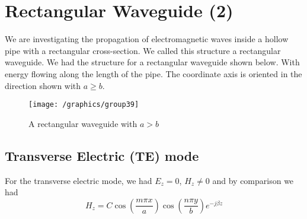 \chapter{Rectangular Waveguide (2)}

We are investigating the propagation of electromagnetic waves inside a hollow pipe with a rectangular cross-section. We called this structure a rectangular waveguide. We had the structure for a rectangular waveguide shown below. With energy flowing along the length of the pipe. The coordinate axis is oriented in the direction shown with $a\geq b$.
\begin{figure}[h]
\centering
\texttt{[image: /graphics/group39]}
\caption{A rectangular waveguide with $a>b$}
\end{figure}

\section{Transverse Electric  (TE) mode}
For the transverse electric mode, we had $E_z = 0$, $H_z \neq 0$ and by comparison we had 
\begin{dmath}
H_z = C\cos(\frac{m\pi x}{a}) \cos(\frac{n\pi y}{b})e^{-j\beta z}
\label{eqn:magneticfield}
\end{dmath}

